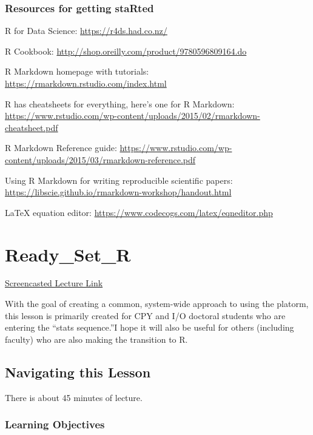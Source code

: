 \documentclass[
  english,
]{book}
\begin{document}
\hypertarget{resources-for-getting-started}{%
\subsection{Resources for getting staRted}\label{resources-for-getting-started}}

R for Data Science: \url{https://r4ds.had.co.nz/}

R Cookbook: \url{http://shop.oreilly.com/product/9780596809164.do}

R Markdown homepage with tutorials: \url{https://rmarkdown.rstudio.com/index.html}

R has cheatsheets for everything, here's one for R Markdown: \url{https://www.rstudio.com/wp-content/uploads/2015/02/rmarkdown-cheatsheet.pdf}

R Markdown Reference guide: \url{https://www.rstudio.com/wp-content/uploads/2015/03/rmarkdown-reference.pdf}

Using R Markdown for writing reproducible scientific papers: \url{https://libscie.github.io/rmarkdown-workshop/handout.html}

LaTeX equation editor: \url{https://www.codecogs.com/latex/eqneditor.php}

\hypertarget{Ready}{%
\chapter{Ready\_Set\_R}\label{Ready}}

\href{https://spu.hosted.panopto.com/Panopto/Pages/Viewer.aspx?id=d080e0bb-e52e-4f38-9965-aa67010b3567}{Screencasted Lecture Link}

With the goal of creating a common, system-wide approach to using the platorm, this lesson is primarily created for CPY and I/O doctoral students who are entering the ``stats sequence.''I hope it will also be useful for others (including faculty) who are also making the transition to R.

\hypertarget{navigating-this-lesson}{%
\section{Navigating this Lesson}\label{navigating-this-lesson}}

There is about 45 minutes of lecture.

\hypertarget{learning-objectives}{%
\subsection{Learning Objectives}\label{learning-objectives}}
\end{document}
